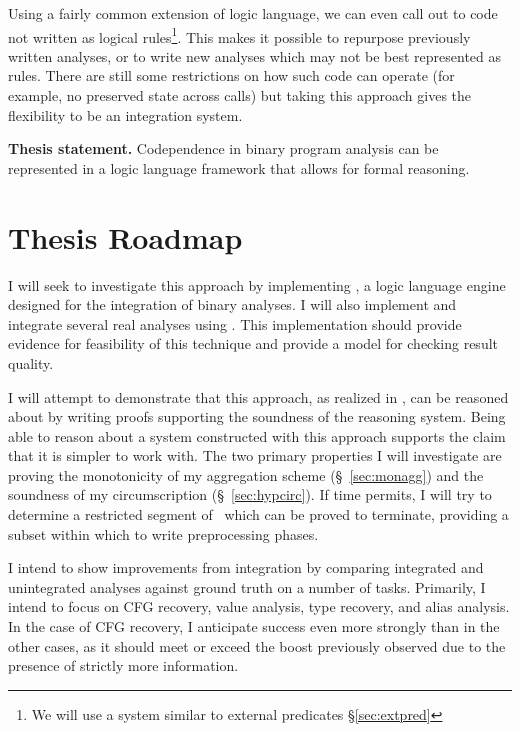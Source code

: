 Using a fairly common extension of logic language, we can even call out to code not written as logical rules\footnote{We will use a system similar to external predicates \S\ref{sec:extpred}}.
This makes it possible to repurpose previously written analyses, or to write new analyses which may not be best represented as rules.
There are still some restrictions on how such code can operate (for example, no preserved state across calls) but taking this approach gives the flexibility to be an integration system.

\begin{inset}
{\bf Thesis statement.}
Codependence in binary program analysis can be represented in a logic language framework that allows for formal reasoning.
\end{inset}
\section{Thesis Roadmap}
I will seek to investigate this approach by implementing \sysname, a logic language engine designed for the integration of binary analyses.
I will also implement and integrate several real analyses using \sysname.
This implementation should provide evidence for feasibility of this technique and provide a model for checking result quality.

I will attempt to demonstrate that this approach, as realized in \sysname, can be reasoned about by writing proofs supporting the soundness of the reasoning system.
Being able to reason about a system constructed with this approach supports the claim that it is simpler to work with.
The two primary properties I will investigate are proving the monotonicity of my aggregation scheme (\S~\ref{sec:monagg}) and the soundness of my circumscription (\S~\ref{sec:hypcirc}).
If time permits, I will try to determine a restricted segment of \sysname\ which can be proved to terminate, providing a subset within which to write preprocessing phases.

I intend to show improvements from integration by comparing integrated and unintegrated analyses against ground truth on a number of tasks.
Primarily, I intend to focus on CFG recovery, value analysis, type recovery, and alias analysis.
In the case of CFG recovery, I anticipate success even more strongly than in the other cases, as it should meet or exceed the boost previously observed\cite{jakstab} due to the presence of strictly more information.

